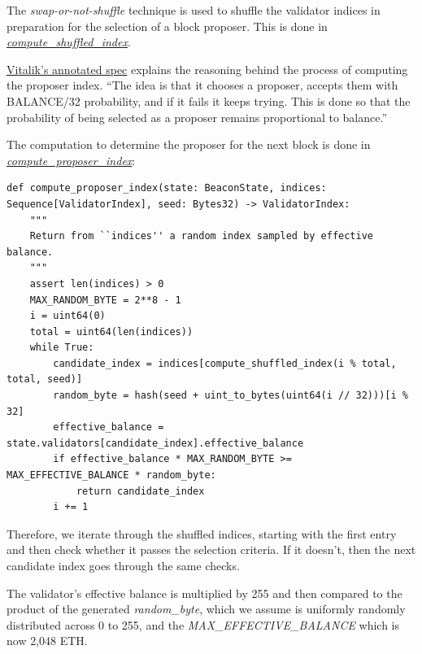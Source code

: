 The \textit{swap-or-not-shuffle} technique \cite{hoang2014}  is used to shuffle the validator indices in preparation for the selection of a block proposer. This is done in \href{https://github.com/ethereum/consensus-specs/blob/9c35b7384e78da643f51f9936c578da7d04db698/specs/phase0/beacon-chain.md#compute_shuffled_index}{\textit{compute\_shuffled\_index}}.

\href{https://notes.ethereum.org/@vbuterin/Sys3GLJbD}{Vitalik's annotated spec} explains the reasoning behind the process of computing the proposer index. ``The idea is that it chooses a proposer, accepts them with BALANCE/32 probability, and if it fails it keeps trying. This is done so that the probability of being selected as a proposer remains proportional to balance.''

The computation to determine the proposer for the next block is done in \href{https://github.com/ethereum/consensus-specs/blob/9c35b7384e78da643f51f9936c578da7d04db698/specs/phase0/beacon-chain.md#compute_proposer_index}{\textit{compute\_proposer\_index}}: 

\lstset{language=Python}

\begin{lstlisting}
def compute_proposer_index(state: BeaconState, indices: Sequence[ValidatorIndex], seed: Bytes32) -> ValidatorIndex:
    """
    Return from ``indices'' a random index sampled by effective balance.
    """
    assert len(indices) > 0
    MAX_RANDOM_BYTE = 2**8 - 1
    i = uint64(0)
    total = uint64(len(indices))
    while True:
        candidate_index = indices[compute_shuffled_index(i % total, total, seed)]
        random_byte = hash(seed + uint_to_bytes(uint64(i // 32)))[i % 32]
        effective_balance = state.validators[candidate_index].effective_balance
        if effective_balance * MAX_RANDOM_BYTE >= MAX_EFFECTIVE_BALANCE * random_byte:
            return candidate_index
        i += 1
\end{lstlisting}


Therefore, we iterate through the shuffled indices, starting with the first entry and then check whether it passes the selection criteria. If it doesn't, then the next candidate index goes through the same checks.

The validator's effective balance is multiplied by 255 and then compared to the product of the generated \textit{random\_byte}, which we assume is uniformly randomly distributed across 0 to 255,  and the \textit{MAX\_EFFECTIVE\_BALANCE} which is now 2,048 ETH. 

